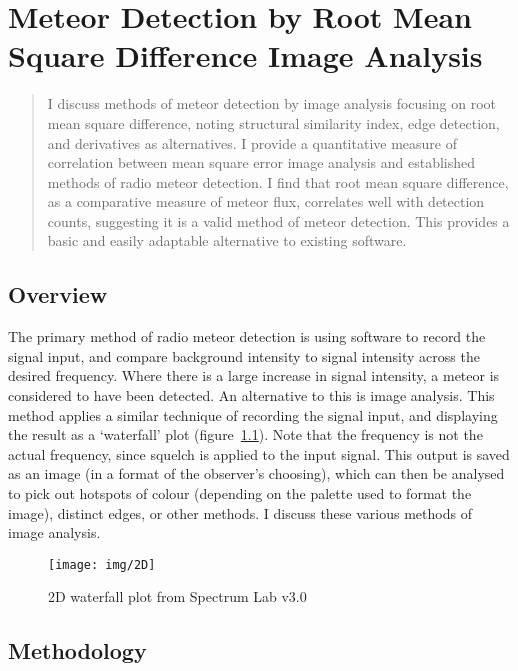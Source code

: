 \chapter{Meteor Detection by Root Mean Square Difference Image Analysis}
\label{chap:image}
\begin{strip}
	\begin{minipage}{\textwidth}
		\begin{abstract}
			I discuss methods of meteor detection by image analysis focusing on root mean square difference, noting structural similarity index, edge detection, and derivatives as alternatives. I provide a quantitative measure of correlation between mean square error image analysis and established methods of radio meteor detection. I find that root mean square difference, as a comparative measure of meteor flux, correlates well with detection counts, suggesting it is a valid method of meteor detection. This provides a basic and easily adaptable alternative to existing software.
		\end{abstract}
	\end{minipage}
\end{strip}
\section{Overview}
The primary method of radio meteor detection is using software to record the signal input, and compare background intensity to signal intensity across the desired frequency. Where there is a large increase in signal intensity, a meteor is considered to have been detected. An alternative to this is image analysis. This method applies a similar technique of recording the signal input, and displaying the result as a `waterfall' plot (figure~\ref{fig:img:waterfall}). Note that the frequency is not the actual frequency, since squelch is applied to the input signal. This output is saved as an image (in a format of the observer's choosing), which can then be analysed to pick out hotspots of colour (depending on the palette used to format the image), distinct edges, or other methods. I discuss these various methods of image analysis.
\begin{figure}
	\centering
	\texttt{[image: img/2D]}
	\caption{2D waterfall plot from Spectrum Lab v3.0 \cite{speclab}
		\label{fig:img:waterfall}}
\end{figure}
\section{Methodology}
